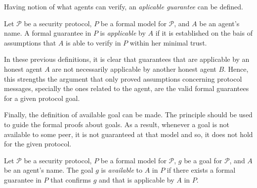Having notion of what agents can verify, an \textit{aplicable guarantee} can be defined.

\begin{definition}
  Let $\mathcal{P}$ be a security protocol, $P$ be a formal model for $\mathcal{P}$, and $A$ be an agent's name. A formal guarantee in $P$ is \textit{applicable} by $A$ if it is established on the bais of assumptions that $A$ is able to verify in $P$ within her minimal trust.
\end{definition}

In these previous definitions, it is clear that guarantees that are applicable by an honest agent $A$ are not necessarily applicable by another honest agent $B$. Hence, this strengths the argument that only proved assumptions concerning protocol messages, specially the ones related to the agent, are the valid formal guarantees for a given protocol goal.

Finally, the definition of available goal can be made. The principle should be used to guide the formal proofs about goals. As a result, whenever a goal is not available to some peer, it is not guaranteed at that model and so, it does not hold for the given protocol.

\begin{definition}
  Let $\mathcal{P}$ be a security protocol, $P$ be a formal model for $\mathcal{P}$, $g$ be a goal for $\mathcal{P}$, and $A$ be an agent's name. The goal $g$ is \textit{available} to $A$ in $P$ if there exists a formal guarantee in $P$ that confirms $g$ and that is applicable by $A$ in $P$.
\end{definition}
